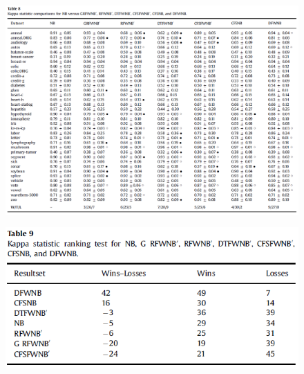 \documentclass[12pt, a4paper]{article}
\begin{document}
\begin{figure}
    \centering
    \includegraphics[width=\linewidth]{images/article1/table8.png}
    \caption{}
    \label{a1_table8}
\end{figure}
\begin{figure}
    \centering
    \includegraphics[width=\linewidth]{images/article1/table9.png}
    \caption{}
    \label{a1_table9}
\end{figure}

\clearpage
\end{document}
